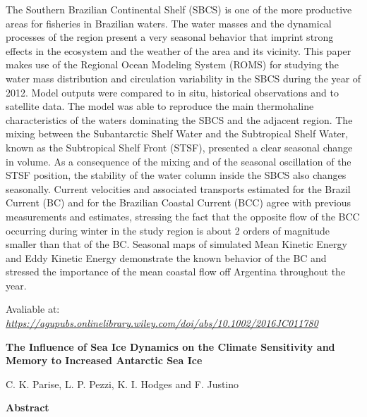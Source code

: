 \noindent The Southern Brazilian Continental Shelf (SBCS) is one of the more productive areas for fisheries in Brazilian waters. The water masses and the dynamical processes of the region 
          present a very seasonal behavior that imprint strong effects in the ecosystem and the weather of the area and its vicinity. This paper makes use of the Regional Ocean Modeling System (ROMS) 
          for studying the water mass distribution and circulation variability in the SBCS during the year of 2012. Model outputs were compared to in situ, historical observations and to satellite data. 
          The model was able to reproduce the main thermohaline characteristics of the waters dominating the SBCS and the adjacent region. The mixing between the Subantarctic Shelf Water and the Subtropical
          Shelf Water, known as the Subtropical Shelf Front (STSF), presented a clear seasonal change in volume. As a consequence of the mixing and of the seasonal oscillation of the STSF position, 
          the stability of the water column inside the SBCS also changes seasonally. Current velocities and associated transports estimated for the Brazil Current (BC) and for the Brazilian Coastal Current 
          (BCC) agree with previous measurements and estimates, stressing the fact that the opposite flow of the BCC occurring during winter in the study region is about 2 orders of magnitude smaller than that
           of the BC. Seasonal maps of simulated Mean Kinetic Energy and Eddy Kinetic Energy demonstrate the known behavior of the BC and stressed the importance of the mean coastal flow off Argentina throughout the year.
\bigskip

\noindent {}
\bigskip

\noindent Avaliable at: \textcolor{bleu_cite}{\href{https://agupubs.onlinelibrary.wiley.com/doi/abs/10.1002/2016JC011780}{\textit{https://agupubs.onlinelibrary.wiley.com/doi/abs/10.1002/2016JC011780}}}

\bigskip


\newpage
\bigskip

\noindent \begin{center} \textbf{The Influence of Sea Ice Dynamics on the Climate Sensitivity and Memory to Increased Antarctic Sea Ice}
\bigskip

\noindent C. K. Parise, L. P. Pezzi, K. I. Hodges and F. Justino
\bigskip

\noindent \textbf{Abstract}\end{center}
\bigskip

